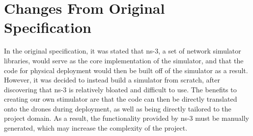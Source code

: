 \section{Changes From Original Specification}
In the original specification, it was stated that ns-3, a set of network simulator libraries, would serve as the core implementation of the simulator, and that the code for physical deployment would then be built off of the simulator as a result. However, it was decided to instead build a simulator from scratch, after discovering that ns-3 is relatively bloated and difficult to use. The benefits to creating our own stimulator are that the code can then be directly translated onto the drones during deployment, as well as being directly tailored to the project domain. As a result, the functionality provided by ns-3 must be manually generated, which may increase the complexity of the project.
